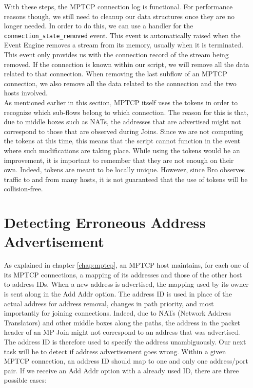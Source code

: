 With these steps, the MPTCP connection log is functional. For performance reasons though, we still need to cleanup our data structures once they are no longer needed. In order to do this, we can use a handler for the \texttt{connection\_state\_removed} event. This event is automatically raised when the Event Engine removes a stream from its memory, usually when it is terminated. This event only provides us with the connection record of the stream being removed. If the connection is known within our script, we will remove all the data related to that connection. When removing the last subflow of an MPTCP connection, we also remove all the data related to the connection and the two hosts involved. \\

As mentioned earlier in this section, MPTCP itself uses the tokens in order to recognize which sub-flows belong to which connection. The reason for this is that, due to middle boxes such as NATs, the addresses that are advertised might not correspond to those that are observed during Joins. Since we are not computing the tokens at this time, this means that the script cannot function in the event where such modifications are taking place. While using the tokens would be an improvement, it is important to remember that they are not enough on their own. Indeed, tokens are meant to be locally unique. However,  since Bro observes traffic to and from many hosts, it is not guaranteed that the use of tokens will be collision-free.

\section{Detecting Erroneous Address Advertisement} \label{section:add addr log}
As explained in chapter \ref{chap:mptcp}, an MPTCP host maintains, for each one of its MPTCP connections, a mapping of its addresses and those of the other host to address IDs. When a new address is advertised, the mapping used by its owner is sent along in the Add Addr option. The address ID is used in place of the actual address for address removal, changes in path priority, and most importantly for joining connections. Indeed, due to NATs (Network Address Translators) and other middle boxes along the paths, the address in the packet header of an MP Join might not correspond to an address that was advertised. The address ID is therefore used to specify the address unambiguously. Our next task will be to detect if address advertisement goes wrong. Within a given MPTCP connection, an address ID should map to one and only one address/port pair. If we receive an Add Addr option with a already used ID, there are three possible cases: \\

